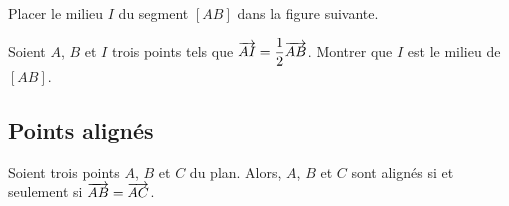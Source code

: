 \documentclass{poly}
\begin{document}
\begin{example}
\hfill
\begin{center}
\end{center}
\end{example}

\begin{example}
Placer le milieu $I$ du segment $[AB]$ dans la figure suivante.
\begin{center}
\end{center}
\end{example}

\begin{example}
Soient $A$, $B$ et $I$ trois points tels que $\overrightarrow{AI} = \dfrac{1}{2}\overrightarrow{AB}$. Montrer que $I$ est le milieu de $[AB]$.

\end{example}

\subsection{Points alignés}

\begin{proposition}
Soient trois points $A$, $B$ et $C$ du plan. Alors, $A$, $B$ et $C$ sont alignés si et seulement si $\overrightarrow{AB} = \overrightarrow{AC}$.
\end{proposition}

\newpage

    
\end{document}

